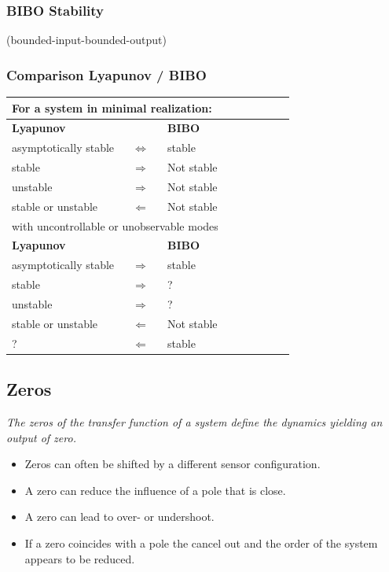 \documentclass[10pt,a4paper]{scrartcl}
\begin{document}
\begin{multicols*}{3}
	\subsubsection{BIBO Stability}
	
	\footnotesize(bounded-input-bounded-output)\normalsize
	
	 
	\subsubsection{Comparison Lyapunov / BIBO}
	 	 
	 
	\begin{tabular}{p{0.4\linewidth}cp{0.45\linewidth}}
	\hline
	\multicolumn{3}{l}{For a system in minimal realization:}\\
	\hline
	\hline
	\textbf{Lyapunov}&&\textbf{BIBO}\\
	asymptotically stable&$\Leftrightarrow$& stable\\
	stable&$\Rightarrow$&Not stable\\
	unstable&$\Rightarrow$&Not stable\\
	stable or unstable&$\Leftarrow$&Not stable\\
	\hline
	\multicolumn{3}{l}{with uncontrollable or unobservable modes}\\
	\hline
	\hline
	\textbf{Lyapunov}&&\textbf{BIBO}\\
	asymptotically stable&$\Rightarrow$&stable\\
	stable&$\Rightarrow$&?\\
	unstable&$\Rightarrow$&?\\
	stable or unstable&$\Leftarrow$&Not stable\\
	?&$\Leftarrow$&stable
	\end{tabular}
	 
	
	
	\subsection{Zeros}
	
	\emph{The zeros of the transfer function of a system define the dynamics yielding an output of zero.}
	
	
	\begin{itemize}
	\compaq
	\item
	Zeros can often be shifted by a different sensor configuration.	
	\item
	A zero can reduce the influence of a pole that is close.
	\item
	A zero can lead to over- or undershoot.
	\item 
	If a zero coincides with a pole the cancel out and the order of the system appears to be reduced.
	\end{itemize}
	

\end{multicols*}
\end{document}
